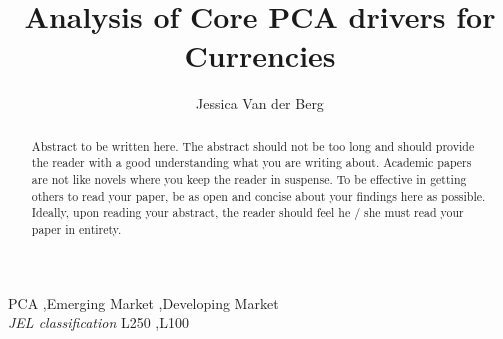 \documentclass[11pt,preprint, authoryear]{elsarticle}
\numberwithin{equation}{section}
\numberwithin{figure}{section}
\numberwithin{table}{section}
\begin{document}
\begin{frontmatter}  %

\title{Analysis of Core PCA drivers for Currencies}





\author[Add1]{Jessica Van der Berg}





\address[Add1]{Stellenbosch Univeristy, South Africa}


\begin{abstract}
\small{
Abstract to be written here. The abstract should not be too long and
should provide the reader with a good understanding what you are writing
about. Academic papers are not like novels where you keep the reader in
suspense. To be effective in getting others to read your paper, be as
open and concise about your findings here as possible. Ideally, upon
reading your abstract, the reader should feel he / she must read your
paper in entirety.
}
\end{abstract}

\vspace{1cm}


\begin{keyword}
\footnotesize{
PCA \sep Emerging Market \sep Developing Market \\
\vspace{0.3cm}
}
\footnotesize{
\textit{JEL classification} L250 \sep L100
}
\end{keyword}



\vspace{0.5cm}

\end{frontmatter}



\pagestyle{fancy}
\chead{}
\lfoot{}
\lhead{}
\cfoot{}


\headsep 35pt %
\end{document}
